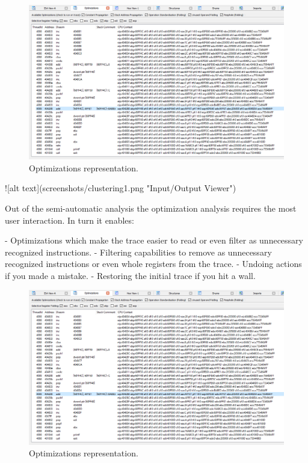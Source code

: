 \documentclass[10pt,twoside,a4paper,bibliography=totoc]{scrbook}
\begin{document}
\begin{figure}[htp]
\centering
\includegraphics[scale=0.55]{images/ch3/optimizations_success.png}
\caption{Optimizations representation.}
\label{opti_add_success}
\end{figure}
![alt text](screenshots/clustering1.png "Input/Output Viewer")

Out of the semi-automatic analysis the  optimization analysis  requires the most user interaction. In turn it enables:

- Optimizations which make the trace easier to read or even filter as unnecessary recognized instructions. 
- Filtering capabilities to remove as unnecessary recognized instructions or even whole registers from the trace.
- Undoing actions if you made a mistake.
- Restoring the initial trace if you hit a wall.

\begin{figure}[htp]
\centering
\includegraphics[scale=0.55]{images/ch3/optimizations_success.png}
\caption{Optimizations representation.}
\label{opti_add_success}
\end{figure}
\end{document}

